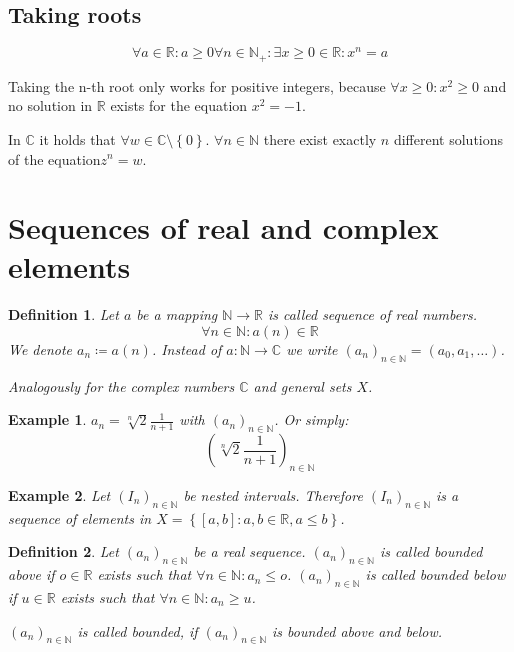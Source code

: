 \documentclass[a4paper,landscape,twocolumn]{article}
\newtheorem{defi}{Definition}
\newtheorem{ex}{Example}
\newcommand\set[1]{\left\{#1\right\}}
\begin{document}
\subsection{Taking roots}
%
\[ \forall a \in \mathbb R: a \geq 0 \forall n \in \mathbb N_+: \exists x \geq 0 \in \mathbb R: x^n = a \]

Taking the n-th root only works for positive integers, because $\forall x \geq 0: x^2 \geq 0$
and no solution in $\mathbb R$ exists for the equation $x^2 = -1$.

In $\mathbb C$ it holds that $\forall w \in \mathbb C \setminus \set{0}$.
$\forall n \in \mathbb N$ there exist exactly $n$ different solutions of the equation$ z^n = w$.

\section{Sequences of real and complex elements}
\begin{defi}
  Let $a$ be a mapping $\mathbb N \rightarrow \mathbb R$ is called \emph{sequence} of real numbers.
  \[ \forall n \in \mathbb N: a(n) \in \mathbb R \]
  We denote $a_n \coloneqq a(n)$.
  Instead of $a: \mathbb N \rightarrow \mathbb C$ we write $(a_n)_{n \in \mathbb N} = (a_0, a_1, \ldots)$.

  Analogously for the complex numbers $\mathbb C$ and general sets $X$.
\end{defi}

\begin{ex}
  $a_n = \sqrt[n]{2} \frac{1}{n + 1}$ with $(a_n)_{n \in \mathbb N}$. Or simply:
  \[ \left(\sqrt[n]{2}\frac{1}{n + 1}\right)_{n \in \mathbb N} \]
\end{ex}

\begin{ex}
  Let $(I_n)_{n \in \mathbb N}$ be nested intervals.
  Therefore $(I_n)_{n \in \mathbb N}$ is a sequence of elements in $X = \set{[a,b]: a,b \in \mathbb R, a \leq b}$.
\end{ex}

\begin{defi}
  Let $(a_n)_{n \in \mathbb N}$ be a real sequence.
  $(a_n)_{n \in \mathbb N}$ is called \emph{bounded above} if $o \in \mathbb R$ exists such that $\forall n \in \mathbb N: a_n \leq o$.
  $(a_n)_{n \in \mathbb N}$ is called \emph{bounded below} if $u \in \mathbb R$ exists such that $\forall n \in \mathbb N: a_n \geq u$.

  $(a_n)_{n \in \mathbb N}$ is called bounded, if $(a_n)_{n \in \mathbb N}$ is bounded above and below.
\end{defi}
\end{document}
